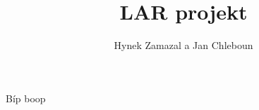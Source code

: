 \documentclass{article}
\title{LAR projekt}
\author{Hynek Zamazal a Jan Chleboun}
\date{}
\begin{document}
\maketitle
Bíp boop
\end{document}
